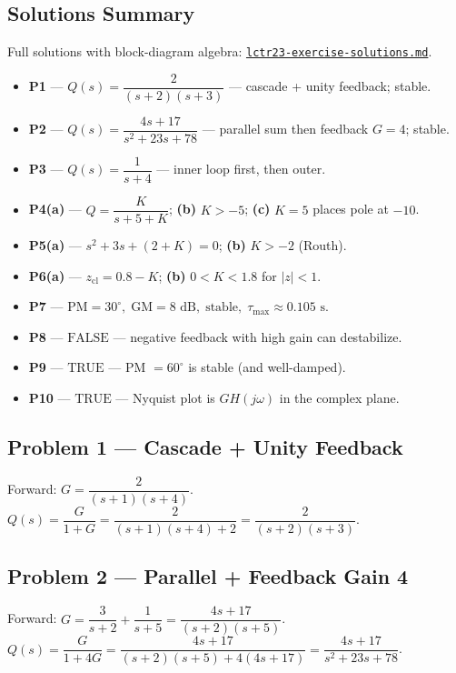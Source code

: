 \documentclass[11pt]{article}
\begin{document}
\subsection*{Solutions Summary}

Full solutions with block-diagram algebra: \href{../hw_practice_problems/lctr23-exercise-solutions.md}{\texttt{lctr23-exercise-solutions.md}}.

\begin{itemize}[leftmargin=*, nosep]
  \item \textbf{P1} --- $\boxed{Q(s) = \dfrac{2}{(s+2)(s+3)}}$ --- cascade + unity feedback; stable.
  \item \textbf{P2} --- $\boxed{Q(s) = \dfrac{4s+17}{s^2+23s+78}}$ --- parallel sum then feedback $G=4$; stable.
  \item \textbf{P3} --- $\boxed{Q(s) = \dfrac{1}{s+4}}$ --- inner loop first, then outer.
  \item \textbf{P4(a)} --- $\boxed{Q = \dfrac{K}{s+5+K}}$; \textbf{(b)} $\boxed{K>-5}$; \textbf{(c)} $\boxed{K=5}$ places pole at $-10$.
  \item \textbf{P5(a)} --- $\boxed{s^2 + 3s + (2+K) = 0}$; \textbf{(b)} $\boxed{K>-2}$ (Routh).
  \item \textbf{P6(a)} --- $\boxed{z_{\text{cl}} = 0.8-K}$; \textbf{(b)} $\boxed{0<K<1.8}$ for $|z|<1$.
  \item \textbf{P7} --- $\boxed{\text{PM}=30^\circ,\; \text{GM}=8\text{ dB},\; \text{stable},\; \tau_{\max}\approx 0.105\text{ s}}$.
  \item \textbf{P8} --- $\boxed{\text{FALSE}}$ --- negative feedback with high gain can destabilize.
  \item \textbf{P9} --- $\boxed{\text{TRUE}}$ --- PM $=60^\circ$ is stable (and well-damped).
  \item \textbf{P10} --- $\boxed{\text{TRUE}}$ --- Nyquist plot is $GH(j\omega)$ in the complex plane.
\end{itemize}

\subsection{Problem 1 --- Cascade + Unity Feedback}
Forward: $G = \dfrac{2}{(s+1)(s+4)}$. $Q(s) = \dfrac{G}{1+G} = \dfrac{2}{(s+1)(s+4) + 2} = \dfrac{2}{(s+2)(s+3)}$.

\subsection{Problem 2 --- Parallel + Feedback Gain 4}
Forward: $G = \dfrac{3}{s+2} + \dfrac{1}{s+5} = \dfrac{4s+17}{(s+2)(s+5)}$.
$Q(s) = \dfrac{G}{1+4G} = \dfrac{4s+17}{(s+2)(s+5) + 4(4s+17)} = \dfrac{4s+17}{s^2 + 23 s + 78}$.
\end{document}
